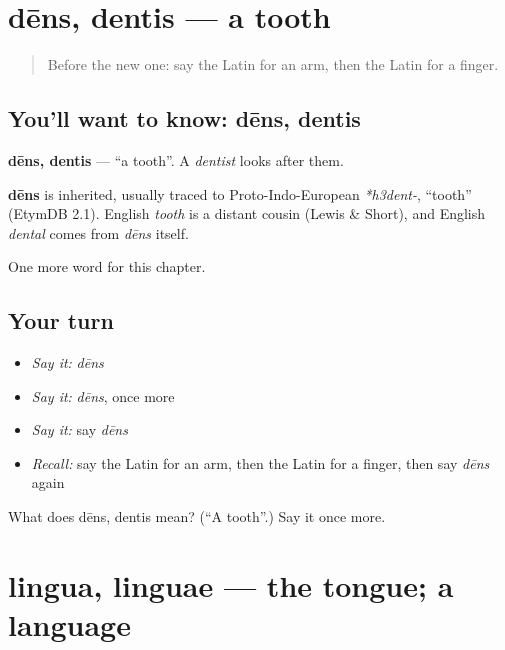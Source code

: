 \section[dēns, dentis]{dēns, dentis — a tooth}

\label{lesson:LA-C63-dens}



\begin{quote}
Before the new one: say the Latin for an arm, then the Latin for a finger.
\end{quote}

\subsection*{You'll want to know: dēns, dentis}
\textbf{dēns, dentis} — \textquotedblleft{}a tooth\textquotedblright{}. A \emph{dentist} looks after them.

\begin{cousinweb}
\textbf{dēns} is inherited, usually traced to Proto-Indo-European \emph{*h3dent-}, \textquotedblleft{}tooth\textquotedblright{} (EtymDB 2.1). English \emph{tooth} is a distant cousin (Lewis \& Short), and English \emph{dental} comes from \emph{dēns} itself.
\end{cousinweb}

\begin{grammarlens}[title={What you've built}]
One more word for this chapter.
\end{grammarlens}

\subsection*{Your turn}
\begin{itemize}
\raggedright
  \item \emph{Say it:} \emph{dēns}
  \item \emph{Say it:} \emph{dēns}, once more
  \item \emph{Say it:} say \emph{dēns}
  \item \emph{Recall:} say the Latin for an arm, then the Latin for a finger, then say \emph{dēns} again
\end{itemize}

\begin{tcolorbox}[breakable,colback=teal!4,colframe=teal!35!black,title={Before you move on}]
What does dēns, dentis mean? (\textquotedblleft{}A tooth\textquotedblright{}.) Say it once more.
\end{tcolorbox}
\section[lingua, linguae]{lingua, linguae — the tongue; a language}

